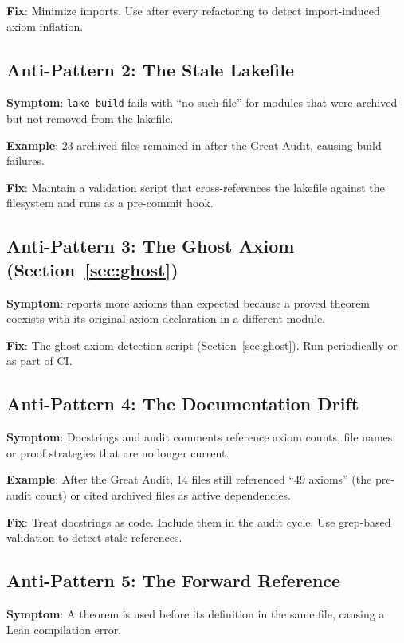 \documentclass[11pt,a4paper]{article}
\begin{document}
\textbf{Fix}: Minimize imports. Use  after
every refactoring to detect import-induced axiom inflation.

\subsection{Anti-Pattern 2: The Stale Lakefile}

\textbf{Symptom}: \texttt{lake build} fails with ``no such file''
for modules that were archived but not removed from the lakefile.

\textbf{Example}: 23 archived files remained in 
after the Great Audit, causing build failures.

\textbf{Fix}: Maintain a validation script that cross-references
the lakefile against the filesystem and runs as a pre-commit hook.

\subsection{Anti-Pattern 3: The Ghost Axiom (Section~\ref{sec:ghost})}

\textbf{Symptom}:  reports more axioms than
expected because a proved theorem coexists with its original axiom
declaration in a different module.

\textbf{Fix}: The ghost axiom detection script (Section~\ref{sec:ghost}).
Run periodically or as part of CI.

\subsection{Anti-Pattern 4: The Documentation Drift}

\textbf{Symptom}: Docstrings and audit comments reference axiom counts,
file names, or proof strategies that are no longer current.

\textbf{Example}: After the Great Audit, 14 files still referenced
``49 axioms'' (the pre-audit count) or cited archived files as active
dependencies.

\textbf{Fix}: Treat docstrings as code. Include them in the audit cycle.
Use grep-based validation to detect stale references.

\subsection{Anti-Pattern 5: The Forward Reference}

\textbf{Symptom}: A theorem is used before its definition in the same
file, causing a Lean compilation error.
\end{document}
